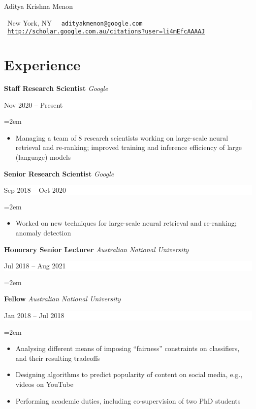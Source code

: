 \documentclass{article}
\newcommand{\MyName}[1]{ %
    \LARGE \usefont{OT1}{phv}{b}{n}
    \begin{center}
        #1
    \end{center}
    \normalsize \normalfont}
\newcommand{\NewPart}[1]{\section*{#1}}
\newcommand{\EducationEntry}[4]{
    \noindent \textbf{#1}
    \textit{#3}
    \hfill      %
    \colorbox{White}{
      \parbox{9em}{
      \hfill\color{Black}#2}} \par  %
    \noindent\hangindent=2em\hangafter=0 \small #4 %
    \normalsize \par}
\newcommand{\WorkEntry}[4]{       %
    \noindent
    \textbf{#1}
    \textit{#3} %
    \hfill      %
    \colorbox{White}{%
      \parbox{9em}{%
      \hfill\color{Black}#2}} \par   %
    \noindent\hangindent=2em\hangafter=0 \small #4 %
    \normalsize \par}
\begin{document}
    
\MyName{Aditya Krishna Menon}
{\par
\begin{center}
    {\small{\small\faMapMarker}\ New York, NY}
    $\ $
    {\small\tt{\small\Letter}\ adityakmenon@google.com}
    $\ $
    {\footnotesize\tt{\footnotesize\faGraduationCap}\ \url{http://scholar.google.com.au/citations?user=li4mEfcAAAAJ}}
\end{center}
\par}



\NewPart{Experience}{}

\WorkEntry
{Staff Research Scientist}
{Nov 2020 -- Present}
{Google}%
{%
\begin{itemize} \itemsep -4pt
    \item Managing a team of $8$ research scientists working on large-scale neural retrieval and re-ranking; improved training and inference efficiency of large (language) models
\end{itemize}
}
\WorkEntry
{Senior Research Scientist}
{Sep 2018 -- Oct 2020}
{Google}
{%
\begin{itemize} \itemsep -4pt
    \item Worked on new techniques for large-scale neural retrieval and re-ranking; anomaly detection
\end{itemize}
}

\WorkEntry
{Honorary Senior Lecturer}
{Jul 2018 -- Aug 2021}
{Australian National University}{\vspace{-\baselineskip}}
\WorkEntry
{Fellow}
{Jan 2018 -- Jul 2018}
{Australian National University}
{%
\begin{itemize} \itemsep -1pt
    \item Analysing different means of imposing ``fairness'' constraints on classifiers, and their resulting tradeoffs 

    \item Designing algorithms to predict popularity of content on social media, e.g., videos on YouTube

    \item Performing academic duties, including co-supervision of two PhD students
\end{itemize}
}
\end{document}
